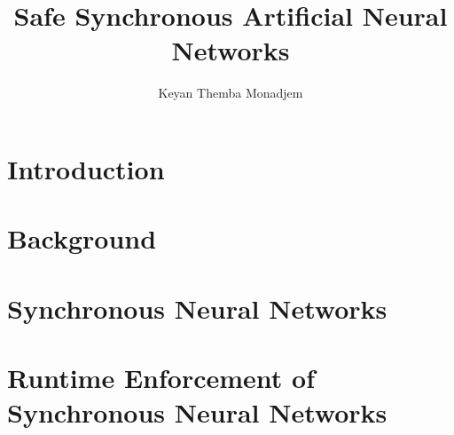 \documentclass[twoside,a4paper,12pt]{uathesis}
\begin{document}
\title{Safe Synchronous Artificial Neural Networks}
\author{Keyan Themba Monadjem}

\maketitle

\frontmatter
{}




\tableofcontents

\listoffigures

\listoftables

%

\mainmatter



\chapter{Introduction}



\chapter{Background}



\chapter{Synchronous Neural Networks}

%









\chapter{Runtime Enforcement of Synchronous Neural Networks}
\end{document}
